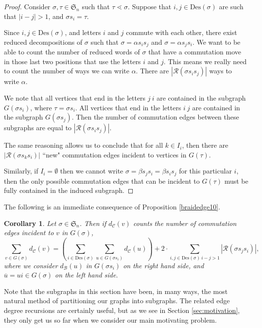 \documentclass[11pt,reqno]{amsart}
\newtheorem{corollary}[theorem]{Corollary}
\theoremstyle{definition}
\theoremstyle{notation}
\newcommand{\Des}{\text{Des}}
\newcommand{\calR}{\mathcal{R}}
\newcommand{\calB}{\mathcal{B}}
\newcommand{\calC}{\mathcal{C}}
\begin{document}
\begin{proof}
Consider $\sigma, \tau \in \mathfrak{S}_n$ such that $\tau \lessdot \sigma $. Suppose that $ i, j\in \Des(\sigma)$ are such that $|i-j|>1$, and $\sigma s_i=\tau $. 

Since $ i, j\in \Des(\sigma)$, and letters $i$ and $j$ commute with each other, there exist reduced decompositions of $\sigma$ such that $\sigma = \alpha s_is_j $ and $\sigma=\alpha s_js_i$. We want to be able to count the number of reduced words of $\sigma$ that have a commutation move in those last two positions that use the letters $i$ and $j$. This means we really need to count the number of ways we can write $\alpha$. There are $|\calR(\sigma s_is_j)|$ ways to write $\alpha$.

We note that all vertices that end in the letters $j~i$ are contained in the subgraph $G(\sigma s_i)$, where $\tau = \sigma s_i$. All vertices that end in the letters $i~j$ are contained in the subgraph $G(\sigma s_{j})$. Then the number of commutation edges between these subgraphs are equal to $|\calR(\sigma s_is_j)|$.

The same reasoning allows us to conclude that for all $k\in I_i$, then there are $|\calR(\sigma s_k s_i)|$ ``new" commutation edges incident to vertices in $G(\tau)$. 

Similarly, if  $I_i=\emptyset$ then we cannot write $\sigma =\beta s_j s_i = \beta s_i s_j$ for this particular $i$, then the only possible commutation edges that can be incident to $G(\tau)$ must be fully contained in the induced subgraph.
\end{proof}

The following is an immediate consequence of Proposition \ref{braidedge10}.

\begin{corollary}\label{coro_edge2}
Let $\sigma \in \mathfrak{S}_n$. Then if $d_\calC(v)$ counts the number of commutation edges incident to $v$ in $G(\sigma)$,
\[
\sum_{v\in G(\sigma)} d_\calC(v) =\left ( \sum_{i\in \Des(\sigma)}\sum_{u\in G(\sigma s_i)}d_\calC(u) \right )+ 2 \cdot \sum_{i,j\in \Des(\sigma) ~i-j>1}|\calR(\sigma s_j s_i)|,
\]
where we consider $d_\calB(u)$ in $G(\sigma s_i)$ on the right hand side, and $\overline{u}=ui \in G(\sigma)$ on the left hand side.
\end{corollary}

Note that the subgraphs in this section have been, in many ways, the most natural method of partitioning our graphs into subgraphs. The related edge degree recursions are certainly useful, but as we see in Section \ref{sec:motivation}, they only get us so far when we consider our main motivating problem. 
\end{document}
